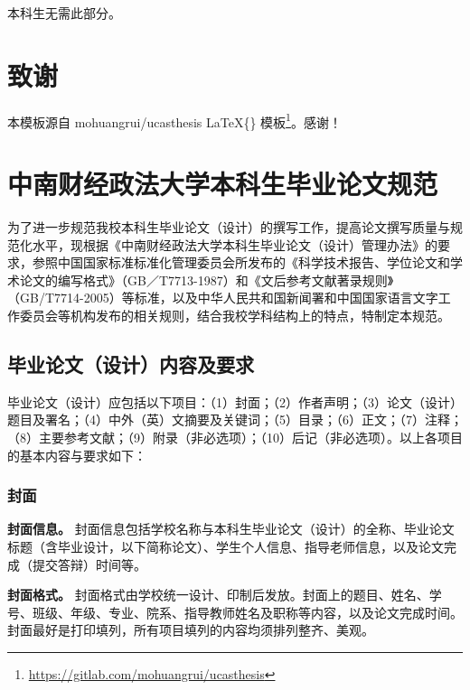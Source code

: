 \documentclass[singlesided]{Style/ucasthesis}%
\begin{document}
本科生无需此部分。

\hypertarget{section-8}{%
\chapter{致谢}\label{section-8}}

本模板源自 mohuangrui/ucasthesis \LaTeX\{\} 模板\footnote{\url{https://gitlab.com/mohuangrui/ucasthesis}}。感谢！

\appendix

\hypertarget{section-9}{%
\chapter{中南财经政法大学本科生毕业论文规范}\label{section-9}}

\raggedbottom

为了进一步规范我校本科生毕业论文（设计）的撰写工作，提高论文撰写质量与规范化水平，现根据《中南财经政法大学本科生毕业论文（设计）管理办法》的要求，参照中国国家标准标准化管理委员会所发布的《科学技术报告、学位论文和学术论文的编写格式》（GB／T7713-1987）和《文后参考文献著录规则》（GB/T7714-2005）等标准，以及中华人民共和国新闻署和中国国家语言文字工作委员会等机构发布的相关规则，结合我校学科结构上的特点，特制定本规范。

\hypertarget{section-10}{%
\section{毕业论文（设计）内容及要求}\label{section-10}}

毕业论文（设计）应包括以下项目：（1）封面；（2）作者声明；（3）论文（设计）题目及署名；（4）中外（英）文摘要及关键词；（5）目录；（6）正文；（7）注释；（8）主要参考文献；（9）附录（非必选项）；（10）后记（非必选项）。以上各项目的基本内容与要求如下：

\hypertarget{section-11}{%
\subsection{封面}\label{section-11}}

\textbf{封面信息。} 封面信息包括学校名称与本科生毕业论文（设计）的全称、毕业论文标题（含毕业设计，以下简称论文）、学生个人信息、指导老师信息，以及论文完成（提交答辩）时间等。

\textbf{封面格式。} 封面格式由学校统一设计、印制后发放。封面上的题目、姓名、学号、班级、年级、专业、院系、指导教师姓名及职称等内容，以及论文完成时间。封面最好是打印填列，所有项目填列的内容均须排列整齐、美观。
\end{document}
